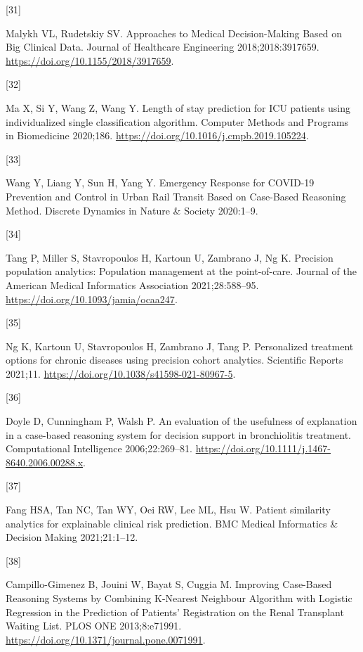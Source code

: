\documentclass[preprint, 3p,
authoryear]{elsarticle} %
\newlength{\cslhangindent}
\newlength{\csllabelwidth}
\newlength{\cslentryspacingunit} %
\newenvironment{CSLReferences}[2] %
 {%
  \setlength{\parindent}{0pt}
  \ifodd #1
  \let\oldpar\par
  \def\par{\hangindent=\cslhangindent\oldpar}
  \fi
  \setlength{\parskip}{#2\cslentryspacingunit}
 }%
 {}
\newcommand{\CSLLeftMargin}[1]{\parbox[t]{\csllabelwidth}{#1}}
\newcommand{\CSLRightInline}[1]{\parbox[t]{\linewidth - \csllabelwidth}{#1}\break}
\begin{document}
\begin{CSLReferences}{0}{0}
\leavevmode{}%
\CSLLeftMargin{{[}31{]} }%
\CSLRightInline{Malykh VL, Rudetskiy SV. Approaches to {Medical
Decision-Making Based} on {Big Clinical Data}. Journal of Healthcare
Engineering 2018;2018:3917659.
\url{https://doi.org/10.1155/2018/3917659}.}

\leavevmode{}%
\CSLLeftMargin{{[}32{]} }%
\CSLRightInline{Ma X, Si Y, Wang Z, Wang Y. Length of stay prediction
for {ICU} patients using individualized single classification algorithm.
Computer Methods and Programs in Biomedicine 2020;186.
\url{https://doi.org/10.1016/j.cmpb.2019.105224}.}

\leavevmode{}%
\CSLLeftMargin{{[}33{]} }%
\CSLRightInline{Wang Y, Liang Y, Sun H, Yang Y. Emergency {Response} for
{COVID-19 Prevention} and {Control} in {Urban Rail Transit Based} on
{Case-Based Reasoning Method}. Discrete Dynamics in Nature \& Society
2020:1--9.}

\leavevmode{}%
\CSLLeftMargin{{[}34{]} }%
\CSLRightInline{Tang P, Miller S, Stavropoulos H, Kartoun U, Zambrano J,
Ng K. Precision population analytics: Population management at the
point-of-care. Journal of the American Medical Informatics Association
2021;28:588--95. \url{https://doi.org/10.1093/jamia/ocaa247}.}

\leavevmode{}%
\CSLLeftMargin{{[}35{]} }%
\CSLRightInline{Ng K, Kartoun U, Stavropoulos H, Zambrano J, Tang P.
Personalized treatment options for chronic diseases using precision
cohort analytics. Scientific Reports 2021;11.
\url{https://doi.org/10.1038/s41598-021-80967-5}.}

\leavevmode{}%
\CSLLeftMargin{{[}36{]} }%
\CSLRightInline{Doyle D, Cunningham P, Walsh P. An evaluation of the
usefulness of explanation in a case-based reasoning system for decision
support in bronchiolitis treatment. Computational Intelligence
2006;22:269--81.
\url{https://doi.org/10.1111/j.1467-8640.2006.00288.x}.}

\leavevmode{}%
\CSLLeftMargin{{[}37{]} }%
\CSLRightInline{Fang HSA, Tan NC, Tan WY, Oei RW, Lee ML, Hsu W. Patient
similarity analytics for explainable clinical risk prediction. BMC
Medical Informatics \& Decision Making 2021;21:1--12.}

\leavevmode{}%
\CSLLeftMargin{{[}38{]} }%
\CSLRightInline{Campillo-Gimenez B, Jouini W, Bayat S, Cuggia M.
Improving {Case-Based Reasoning Systems} by {Combining K-Nearest
Neighbour Algorithm} with {Logistic Regression} in the {Prediction} of
{Patients}' {Registration} on the {Renal Transplant Waiting List}. PLOS
ONE 2013;8:e71991. \url{https://doi.org/10.1371/journal.pone.0071991}.}


\end{CSLReferences}
\end{document}

